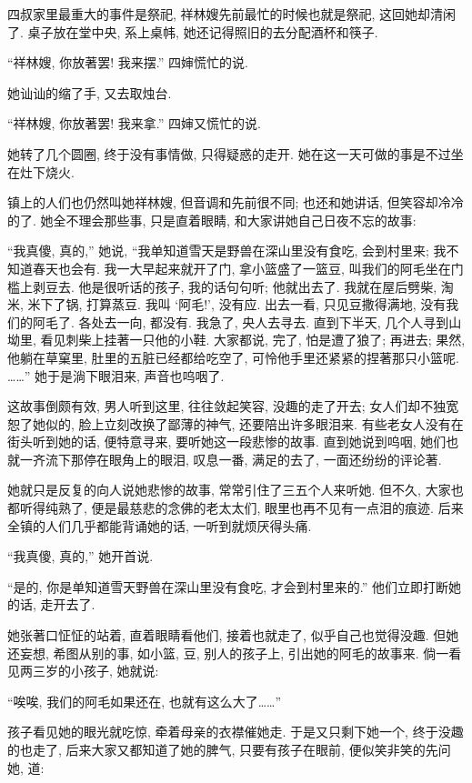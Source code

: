 四叔家里最重大的事件是祭祀,
祥林嫂先前最忙的时候也就是祭祀,
这回她却清闲了.
桌子放在堂中央, 系上桌帏,
她还记得照旧的去分配酒杯和筷子.

``祥林嫂, 你放著罢!
我来摆.''
四婶慌忙的说.

她讪讪的缩了手, 又去取烛台.

``祥林嫂, 你放著罢!
我来拿.'' 四婶又慌忙的说.

她转了几个圆圈, 终于没有事情做, 只得疑惑的走开.
她在这一天可做的事是不过坐在灶下烧火.

镇上的人们也仍然叫她祥林嫂, 但音调和先前很不同;
也还和她讲话, 但笑容却冷冷的了.
她全不理会那些事, 只是直着眼睛, 和大家讲她自己日夜不忘的故事:

``我真傻, 真的,''
她说,
``我单知道雪天是野兽在深山里没有食吃, 会到村里来;
我不知道春天也会有.
我一大早起来就开了门, 拿小篮盛了一篮豆,
叫我们的阿毛坐在门槛上剥豆去.
他是很听话的孩子, 我的话句句听;
他就出去了.
我就在屋后劈柴, 淘米, 米下了锅, 打算蒸豆.
我叫 `阿毛!', 没有应.
出去一看, 只见豆撒得满地, 没有我们的阿毛了.
各处去一向, 都没有.
我急了, 央人去寻去.
直到下半天, 几个人寻到山坳里, 看见刺柴上挂著一只他的小鞋.
大家都说, 完了, 怕是遭了狼了;
再进去;
果然, 他躺在草窠里, 肚里的五脏已经都给吃空了,
可怜他手里还紧紧的捏著那只小篮呢.
……''
她于是淌下眼泪来, 声音也呜咽了.

这故事倒颇有效,
男人听到这里, 往往敛起笑容, 没趣的走了开去;
女人们却不独宽恕了她似的, 脸上立刻改换了鄙薄的神气,
还要陪出许多眼泪来.
有些老女人没有在街头听到她的话, 便特意寻来,
要听她这一段悲惨的故事.
直到她说到呜咽, 她们也就一齐流下那停在眼角上的眼泪,
叹息一番, 满足的去了, 一面还纷纷的评论著.

她就只是反复的向人说她悲惨的故事, 常常引住了三五个人来听她.
但不久, 大家也都听得纯熟了,
便是最慈悲的念佛的老太太们, 眼里也再不见有一点泪的痕迹.
后来全镇的人们几乎都能背诵她的话, 一听到就烦厌得头痛.

``我真傻, 真的,''
她开首说.

``是的, 你是单知道雪天野兽在深山里没有食吃, 才会到村里来的.''
他们立即打断她的话, 走开去了.

她张著口怔怔的站着, 直着眼睛看他们,
接着也就走了, 似乎自己也觉得没趣.
但她还妄想, 希图从别的事, 如小篮, 豆, 别人的孩子上,
引出她的阿毛的故事来.
倘一看见两三岁的小孩子, 她就说:

``唉唉, 我们的阿毛如果还在, 也就有这么大了……''

孩子看见她的眼光就吃惊, 牵着母亲的衣襟催她走.
于是又只剩下她一个, 终于没趣的也走了,
后来大家又都知道了她的脾气, 只要有孩子在眼前,
便似笑非笑的先问她, 道:

